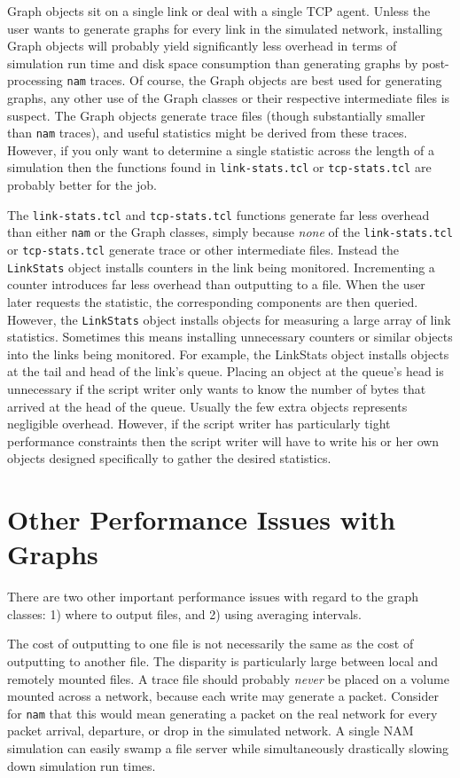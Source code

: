 \documentclass[11pt]{article}
\begin{document}
Graph objects sit on a single link or deal with a single TCP agent.
Unless the user wants to generate graphs for every link in the
simulated network, installing Graph objects will probably yield
significantly less overhead in terms of simulation run time and disk
space consumption than generating graphs by post-processing \verb|nam|
traces.  Of course, the Graph objects are best used for generating
graphs, any other use of the Graph classes or their respective
intermediate files is suspect.  The Graph objects generate trace files
(though substantially smaller than \verb|nam| traces), and useful
statistics might be derived from these traces.  However, if you only
want to determine a single statistic across the length of a simulation
then the functions found in \verb|link-stats.tcl| or
\verb|tcp-stats.tcl| are probably better for the job.

The \verb|link-stats.tcl| and \verb|tcp-stats.tcl| functions generate
far less overhead than either \verb|nam| or the Graph classes, simply
because \emph{none} of the \verb|link-stats.tcl| or
\verb|tcp-stats.tcl| generate trace or other intermediate files.
Instead the \verb|LinkStats| object installs counters in the link
being monitored.  Incrementing a counter introduces far less overhead
than outputting to a file.  When the user later requests the statistic,
the corresponding components are then queried.  However, the
\verb|LinkStats| object installs objects for measuring a large array
of link statistics.  Sometimes this means installing unnecessary
counters or similar objects into the links being monitored.  For
example, the LinkStats object installs objects at the tail and head of
the link's queue.  Placing an object at the queue's head is
unnecessary if the script writer only wants to know the number of
bytes that arrived at the head of the queue.  Usually the few extra
objects represents negligible overhead.  However, if the script writer
has particularly tight performance constraints then the script writer
will have to write his or her own objects designed specifically to
gather the desired statistics.

\section{Other Performance Issues with Graphs}

There are two other important performance issues with regard to the
graph classes: 1) where to output files, and 2) using averaging
intervals.

The cost of outputting to one file is not necessarily the same as the
cost of outputting to another file.  The disparity is particularly large
between local and remotely mounted files.  A trace file should
probably \emph{never} be placed on a volume mounted across a network,
because each write may generate a packet.  Consider for \verb|nam|
that this would mean generating a packet on the real network for every
packet arrival, departure, or drop in the simulated network.  A single
NAM simulation can easily swamp a file server while simultaneously
drastically slowing down simulation run times.
\end{document}
